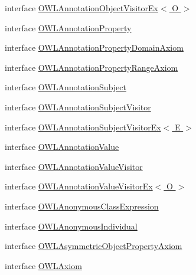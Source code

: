 \begin{DoxyCompactItemize}
\item 
interface \hyperlink{interfaceorg_1_1semanticweb_1_1owlapi_1_1model_1_1_o_w_l_annotation_object_visitor_ex_3_01_o_01_4}{O\-W\-L\-Annotation\-Object\-Visitor\-Ex$<$ O $>$}
\item 
interface \hyperlink{interfaceorg_1_1semanticweb_1_1owlapi_1_1model_1_1_o_w_l_annotation_property}{O\-W\-L\-Annotation\-Property}
\item 
interface \hyperlink{interfaceorg_1_1semanticweb_1_1owlapi_1_1model_1_1_o_w_l_annotation_property_domain_axiom}{O\-W\-L\-Annotation\-Property\-Domain\-Axiom}
\item 
interface \hyperlink{interfaceorg_1_1semanticweb_1_1owlapi_1_1model_1_1_o_w_l_annotation_property_range_axiom}{O\-W\-L\-Annotation\-Property\-Range\-Axiom}
\item 
interface \hyperlink{interfaceorg_1_1semanticweb_1_1owlapi_1_1model_1_1_o_w_l_annotation_subject}{O\-W\-L\-Annotation\-Subject}
\item 
interface \hyperlink{interfaceorg_1_1semanticweb_1_1owlapi_1_1model_1_1_o_w_l_annotation_subject_visitor}{O\-W\-L\-Annotation\-Subject\-Visitor}
\item 
interface \hyperlink{interfaceorg_1_1semanticweb_1_1owlapi_1_1model_1_1_o_w_l_annotation_subject_visitor_ex_3_01_e_01_4}{O\-W\-L\-Annotation\-Subject\-Visitor\-Ex$<$ E $>$}
\item 
interface \hyperlink{interfaceorg_1_1semanticweb_1_1owlapi_1_1model_1_1_o_w_l_annotation_value}{O\-W\-L\-Annotation\-Value}
\item 
interface \hyperlink{interfaceorg_1_1semanticweb_1_1owlapi_1_1model_1_1_o_w_l_annotation_value_visitor}{O\-W\-L\-Annotation\-Value\-Visitor}
\item 
interface \hyperlink{interfaceorg_1_1semanticweb_1_1owlapi_1_1model_1_1_o_w_l_annotation_value_visitor_ex_3_01_o_01_4}{O\-W\-L\-Annotation\-Value\-Visitor\-Ex$<$ O $>$}
\item 
interface \hyperlink{interfaceorg_1_1semanticweb_1_1owlapi_1_1model_1_1_o_w_l_anonymous_class_expression}{O\-W\-L\-Anonymous\-Class\-Expression}
\item 
interface \hyperlink{interfaceorg_1_1semanticweb_1_1owlapi_1_1model_1_1_o_w_l_anonymous_individual}{O\-W\-L\-Anonymous\-Individual}
\item 
interface \hyperlink{interfaceorg_1_1semanticweb_1_1owlapi_1_1model_1_1_o_w_l_asymmetric_object_property_axiom}{O\-W\-L\-Asymmetric\-Object\-Property\-Axiom}
\item 
interface \hyperlink{interfaceorg_1_1semanticweb_1_1owlapi_1_1model_1_1_o_w_l_axiom}{O\-W\-L\-Axiom}

\end{DoxyCompactItemize}
